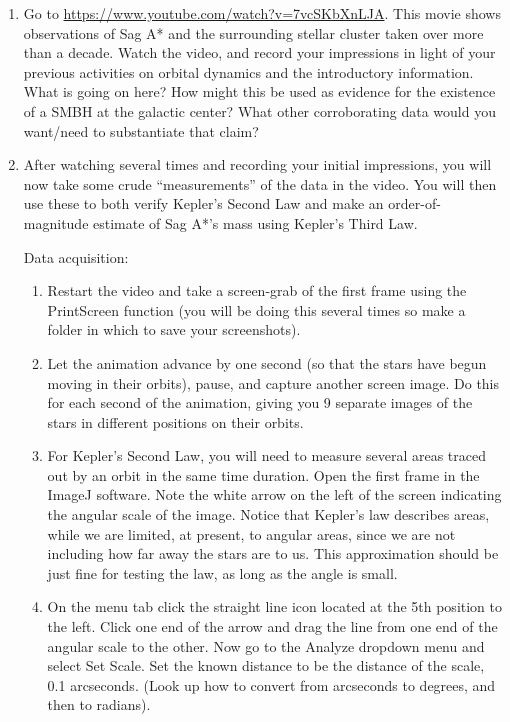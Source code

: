 \begin{enumerate}
	\item Go to \url{https://www.youtube.com/watch?v=7vcSKbXnLJA}. This movie shows observations of Sag
	A* and the surrounding stellar cluster taken over more than a decade. Watch the video, and record
	your impressions in light of your previous activities on orbital dynamics and the introductory
	information. What is going on here? How might this be used as evidence for the existence
	of a SMBH at the galactic center? What other corroborating data would you want/need to
	substantiate that claim?
	
	\item After watching several times and recording your initial impressions, you will now take some crude “measurements” of the data in the video. You will then use these to both verify Kepler’s Second Law and make an order-of-magnitude estimate of Sag A*’s mass using Kepler’s Third Law.
	
	Data acquisition:
	\begin{enumerate}
		\item Restart the video and take a screen-grab of the first frame using the PrintScreen function (you will
		be doing this several times so make a folder in which to save your screenshots).
		
		\item Let the animation advance by one second (so that the stars have begun moving in their
		orbits), pause, and capture another screen image. Do this for each second of the animation,
		giving you 9 separate images of the stars in different positions on their orbits.
		
		\item For Kepler's Second Law, you will need to measure several areas traced out by an orbit in the same time duration. Open the first frame in the ImageJ software. Note the white arrow on the left of the
		screen indicating the angular scale of the image. Notice that Kepler's law describes areas, while we are limited, at present, to angular areas, since we are not including how far away the stars are to us. This approximation should be just fine for testing the law, as long as the angle is small.
		
		\item On the menu tab click the straight line icon
		located at the 5th position to the left. Click one end of the arrow and drag the line from one
		end of the angular scale to the other. Now go to the Analyze dropdown menu and select Set
		Scale. Set the known distance to be the distance of the scale, 0.1 arcseconds. (Look up how
		to convert from arcseconds to degrees, and then to radians).
		

\end{enumerate}
\end{enumerate}
